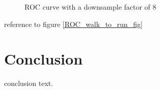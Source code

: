 \documentclass[journal]{IEEEtran}
\begin{document}
\begin{figure}[!tbp]
\begin{minipage}[b]{0.45\textwidth}
        \caption{\label{ROC_walk_to_bike_fig}ROC curve with a downsample factor of 8}
     \end{minipage}
\end{figure}
reference to figure \ref{ROC_walk_to_run_fig}
%
\section{Conclusion}
conclusion text.
%
\appendices
%
\ifCLASSOPTIONcaptionsoff
  \newpage
\fi
%


\end{document}
